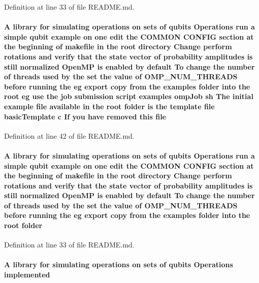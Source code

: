 Definition at line 33 of file README.md.\hypertarget{README_8md_a5078360f0afc4e756290c3197d1abfe9}{
\paragraph[{file}]{\setlength{\rightskip}{0pt plus 5cm}A library for simulating operations on sets of qubits Operations run a simple qubit example on one edit the COMMON CONFIG section at the beginning of makefile in the root directory Change perform {\bf rotations} and verify that the state vector of probability amplitudes {\bf is} still normalized OpenMP {\bf is} enabled by default To change the number of threads used by the set the value of {\bf OMP\_\-NUM\_\-THREADS} before running the {\bf eg} export copy from the examples {\bf folder} into the root {\bf eg} use the job submission script examples ompJob sh The initial example {\bf file} available in the root {\bf folder} {\bf is} the template {\bf file} basicTemplate c If you have removed this {\bf file}}\hfill}
\label{README_8md_a5078360f0afc4e756290c3197d1abfe9}


Definition at line 42 of file README.md.\hypertarget{README_8md_ac5527449269e33be598e819921cd9e43}{
\paragraph[{folder}]{\setlength{\rightskip}{0pt plus 5cm}A library for simulating operations on sets of qubits Operations run a simple qubit example on one edit the COMMON CONFIG section at the beginning of makefile in the root directory Change perform {\bf rotations} and verify that the state vector of probability amplitudes {\bf is} still normalized OpenMP {\bf is} enabled by default To change the number of threads used by the set the value of {\bf OMP\_\-NUM\_\-THREADS} before running the {\bf eg} export copy from the examples {\bf folder} into the root {\bf folder}}\hfill}
\label{README_8md_ac5527449269e33be598e819921cd9e43}


Definition at line 33 of file README.md.\hypertarget{README_8md_ac5baa948678e94eb0b3a2aebcb4fa2d5}{
\paragraph[{implemented}]{\setlength{\rightskip}{0pt plus 5cm}A library for simulating operations on sets of qubits Operations {\bf implemented}}\hfill}
\label{README_8md_ac5baa948678e94eb0b3a2aebcb4fa2d5}


